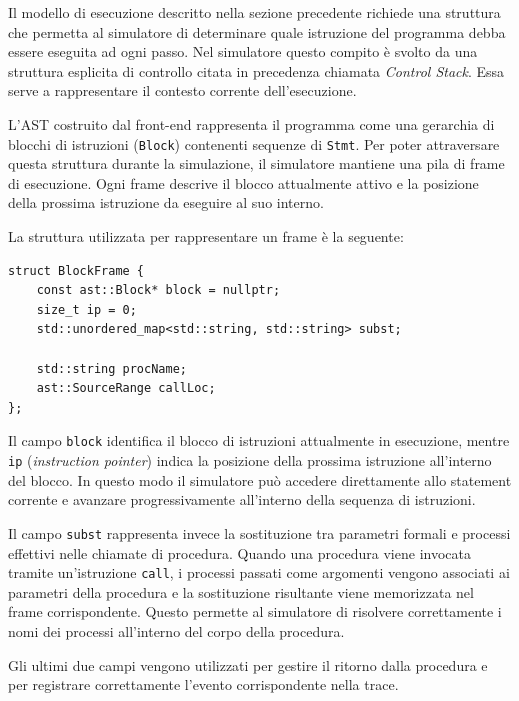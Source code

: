 Il modello di esecuzione descritto nella sezione precedente richiede una struttura che permetta al simulatore di determinare quale istruzione del programma debba essere eseguita ad ogni passo. Nel simulatore questo compito è svolto da una struttura esplicita di controllo citata in precedenza chiamata \textit{Control Stack}. Essa serve a rappresentare il contesto corrente dell’esecuzione.

L’AST costruito dal front-end rappresenta il programma come una gerarchia di blocchi di istruzioni (\texttt{Block}) contenenti sequenze di \texttt{Stmt}. Per poter attraversare questa struttura durante la simulazione, il simulatore mantiene una pila di frame di esecuzione. Ogni frame descrive il blocco attualmente attivo e la posizione della prossima istruzione da eseguire al suo interno.

La struttura utilizzata per rappresentare un frame è la seguente:

\begin{tcolorbox}[colback=white,colframe=black!35,boxrule=0.4pt]
\begin{lstlisting}
struct BlockFrame {
    const ast::Block* block = nullptr;
    size_t ip = 0;
    std::unordered_map<std::string, std::string> subst;

    std::string procName;
    ast::SourceRange callLoc;
};
\end{lstlisting}
\end{tcolorbox}

Il campo \texttt{block} identifica il blocco di istruzioni attualmente in esecuzione, mentre \texttt{ip} (\textit{instruction pointer}) indica la posizione della prossima istruzione all’interno del blocco. In questo modo il simulatore può accedere direttamente allo statement corrente e avanzare progressivamente all’interno della sequenza di istruzioni.

Il campo \texttt{subst} rappresenta invece la sostituzione tra parametri formali e processi effettivi nelle chiamate di procedura. Quando una procedura viene invocata tramite un’istruzione \texttt{call}, i processi passati come argomenti vengono associati ai parametri della procedura e la sostituzione risultante viene memorizzata nel frame corrispondente. Questo permette al simulatore di risolvere correttamente i nomi dei processi all’interno del corpo della procedura.

Gli ultimi due campi vengono utilizzati per gestire il ritorno dalla procedura e per registrare correttamente l’evento corrispondente nella trace.

